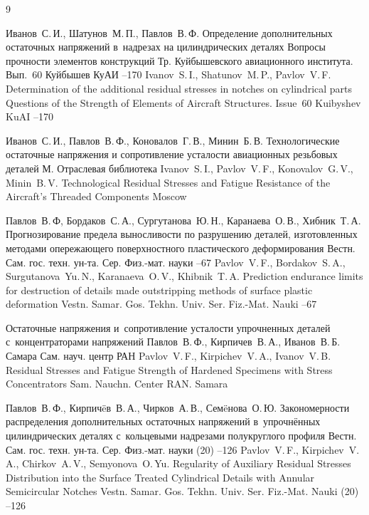 \begin{thebibliography}{9}

\by  Иванов~С.\,И., Шатунов~М.\,П., Павлов~В.\,Ф. 
\paper Определение дополнительных остаточных напряжений в~надрезах на цилиндрических деталях
\inbook Вопросы прочности элементов конструкций
\bookinfo Тр. Куйбышевского авиационного института. Вып.~60
\publaddr Куйбышев
\publ КуАИ
--170
\misctransl
\by Ivanov~S.\,I., Shatunov~M.\,P., Pavlov~V.\,F.
\paper Determination of the additional residual stresses in notches on cylindrical parts
\inbook Questions of the Strength of Elements of Aircraft Structures. \rm Issue~60
\publaddr Kuibyshev
\publ KuAI
--170

\by  Иванов~С.\,И., Павлов~В.\,Ф., Коновалов~Г.\,В., Минин~Б.\,В.
\book Технологические остаточные напряжения и сопротивление усталости авиационных резьбовых деталей
\publaddr М.
\miscnote Отраслевая библиотека
\misctransl
\by Ivanov~S.\,I., Pavlov~V.\,F., Konovalov~G.\,V., Minin~B.\,V.
\book Technological Residual Stresses and Fatigue Resistance of the Aircraft’s Threaded Components
\publaddr Moscow


\by Павлов~В.\,Ф, Бордаков~С.\,А., Сургутанова~Ю.\,Н., Каранаева~О.\,В., Хибник~Т.\,А.
\paper Прогнозирование предела выносливости по разрушению деталей, изготовленных методами опережающего поверхностного пластического деформирования
\jour Вестн. Сам. гос. техн. ун-та. Сер. Физ.-мат. науки
--67
\misctransl
\by Pavlov~V.\,F., Bordakov~S.\,A., Surgutanova~Yu.\,N., Karanaeva~O.\,V., Khibnik~T.\,A.
\paper Prediction endurance limits for destruction of details made outstripping methods of surface plastic deformation
\jour Vestn. Samar. Gos. Tekhn. Univ. Ser. Fiz.-Mat. Nauki
--67

\book Остаточные напряжения и~сопротивление усталости упрочненных деталей с~концентраторами напряжений 
\by Павлов~В.\,Ф., Кирпичев~В.\,А.,  Иванов~В.\,Б.
\publaddr Самара
\publ Сам. науч. центр РАН
\misctransl
\by Pavlov~V.\,F., Kirpichev~V.\,A., Ivanov~V.\,B.
\book Residual Stresses and Fatigue Strength of Hardened Specimens with Stress Concentrators 
\publ Sam. Nauchn. Center RAN.
\publaddr Samara 




\by Павлов~В.\,Ф., Кирпич\"eв~В.\,А., Чирков~А.\,В., Сем\"eнова~О.\,Ю.
\paper Закономерности распределения дополнительных остаточных напряжений в~упрочнённых цилиндрических деталях с~кольцевыми надрезами полукруглого профиля
\jour Вестн. Сам. гос. техн. ун-та. Сер. Физ.-мат. науки
(20)
--126
\misctransl
\by Pavlov~V.\,F., Kirpichev~V.\,A., Chirkov~A.\,V., Semyonova~O.\,Yu.
\paper Regularity of Auxiliary Residual Stresses Distribution into the Surface Treated Cylindrical Details with Annular Semicircular Notches
\jour Vestn. Samar. Gos. Tekhn. Univ. Ser. Fiz.-Mat. Nauki
(20)
--126


\end{thebibliography}
